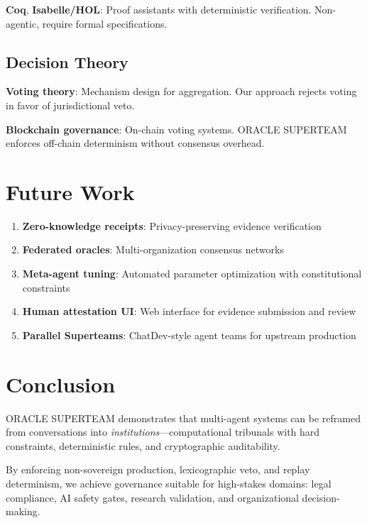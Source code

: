 \documentclass[11pt, letterpaper]{article}
\begin{document}
\textbf{Coq}, \textbf{Isabelle/HOL}: Proof assistants with deterministic verification. Non-agentic, require formal specifications.

\subsection{Decision Theory}

\textbf{Voting theory}: Mechanism design for aggregation. Our approach rejects voting in favor of jurisdictional veto.

\textbf{Blockchain governance}: On-chain voting systems. ORACLE SUPERTEAM enforces off-chain determinism without consensus overhead.

\section{Future Work}

\begin{enumerate}
    \item \textbf{Zero-knowledge receipts}: Privacy-preserving evidence verification
    \item \textbf{Federated oracles}: Multi-organization consensus networks
    \item \textbf{Meta-agent tuning}: Automated parameter optimization with constitutional constraints
    \item \textbf{Human attestation UI}: Web interface for evidence submission and review
    \item \textbf{Parallel Superteams}: ChatDev-style agent teams for upstream production
\end{enumerate}

\section{Conclusion}

ORACLE SUPERTEAM demonstrates that multi-agent systems can be reframed from conversations into \textit{institutions}—computational tribunals with hard constraints, deterministic rules, and cryptographic auditability.

By enforcing non-sovereign production, lexicographic veto, and replay determinism, we achieve governance suitable for high-stakes domains: legal compliance, AI safety gates, research validation, and organizational decision-making.
\end{document}
